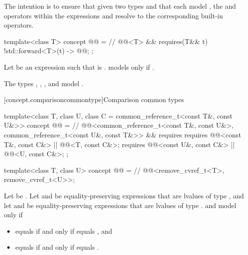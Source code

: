 \pnum
\begin{note}
The intention is to ensure that
given two types  and 
that each model ,
the \tcode{\&\&} and \tcode{||} operators within the expressions
 and
resolve to the corresponding built-in operators.
\end{note}

\begin{itemdecl}
template<class T>
  concept @@ =                // \expos
    @@<T> && requires(T&& t) {
      { !std::forward<T>(t) } -> @@;
    };
\end{itemdecl}

\pnum
Let  be an expression such that
 is .
 models  only if
.

\pnum
\begin{example}
The types
,
,
, and
model .
\end{example}

[concept.comparisoncommontype]{Comparison common types}

\begin{itemdecl}
template<class T, class U, class C = common_reference_t<const T&, const U&>>
  concept @@ =   // \expos
    @@<common_reference_t<const T&, const U&>,
            common_reference_t<const U&, const T&>> &&
    requires {
      requires @@<const T&, const C&> || @@<T, const C&>;
      requires @@<const U&, const C&> || @@<U, const C&>;
    };

template<class T, class U>
  concept @@ =   // \expos
    @@<remove_cvref_t<T>, remove_cvref_t<U>>;
\end{itemdecl}

\pnum
Let  be .
Let  and  be equality-preserving expressions
that are lvalues of type , and
let  and  be equality-preserving expressions
that are lvalues of type .
 and  model
 only if
\begin{itemize}
\item
{} equals
if and only if  equals , and
\item
{} equals
if and only if  equals .
\end{itemize}

